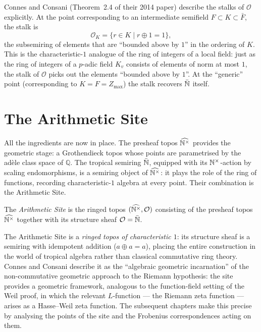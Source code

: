 \begin{remark}
  Connes and Consani (Theorem~2.4 of their 2014 paper) describe the
  stalks of $\mathcal{O}$ explicitly.  At the point corresponding to an
  intermediate semifield $F \subset K \subset \bar{F}$, the stalk is
  \[
    \mathcal{O}_K = \{ r \in K \mid r \oplus 1 = 1 \},
  \]
  the subsemiring of elements that are ``bounded above by $1$'' in the
  ordering of $K$.  This is the characteristic-$1$ analogue of the ring of integers of a
  local field: just as the ring of integers of a $p$-adic field $K_v$
  consists of elements of norm at most $1$, the stalk
  of $\mathcal{O}$ picks out the elements ``bounded above by $1$''.
  At the ``generic'' point (corresponding to $K = F = Z_{\max}$) the
  stalk recovers $\bar{\mathbb{N}}$ itself.
\end{remark}

\chapter{The Arithmetic Site}

All the ingredients are now in place.  The presheaf topos $\widehat{\mathbb{N}^{\times}}$
provides the geometric stage: a Grothendieck topos whose points are
parametrised by the ad\`ele class space of $\mathbb{Q}$.  The tropical
semiring $\bar{\mathbb{N}}$, equipped with its $\mathbb{N}^{\times}$-action by scaling
endomorphisms, is a semiring object of $\widehat{\mathbb{N}^{\times}}$: it plays the role
of the ring of functions, recording characteristic-$1$ algebra at every
point.  Their combination is the Arithmetic Site.

\begin{definition}[label=def:arithmetic_site,
                  uses=def:presheaf_topos, def:structure_sheaf]
  \label{def:arithmetic_site}
  The \emph{Arithmetic Site} is the ringed topos $(\widehat{\mathbb{N}^{\times}}, \mathcal{O})$
  consisting of the presheaf topos $\widehat{\mathbb{N}^{\times}}$ together with its
  structure sheaf $\mathcal{O} = \bar{\mathbb{N}}$.
\end{definition}

\begin{remark}
  The Arithmetic Site is a \emph{ringed topos of characteristic $1$}:
  its structure sheaf is a semiring with idempotent addition ($a \oplus
  a = a$), placing the entire construction in the world of tropical
  algebra rather than classical commutative ring theory.  Connes and
  Consani describe it as the ``algebraic geometric incarnation'' of the
  non-commutative geometric approach to the Riemann hypothesis: the site
  provides a geometric framework, analogous to the function-field setting
  of the Weil proof, in which the relevant $L$-function --- the Riemann
  zeta function --- arises as a Hasse--Weil zeta function.  The
  subsequent chapters make this precise by analysing the points of the
  site and the Frobenius correspondences acting on them.
\end{remark}

